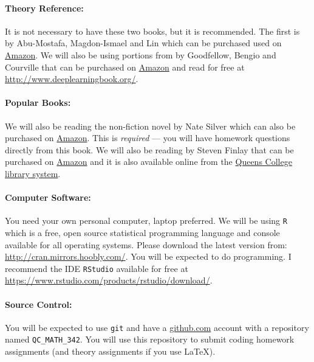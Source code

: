 \documentclass[12pt]{article}
\begin{document}
\paragraph{Theory Reference:} It is not necessary to have these two books, but it is recommended. The first is  by Abu-Mostafa, Magdon-Ismael and Lin which can be purchased used on \href{https://www.amazon.com/Learning-Data-Yaser-S-Abu-Mostafa/dp/1600490069}{Amazon}. We will also be using portions from  by Goodfellow, Bengio and Courville that can be purchased on \href{https://www.amazon.com/Deep-Learning-Adaptive-Computation-Machine/dp/0262035618}{Amazon} and read for free at \url{http://www.deeplearningbook.org/}.

\paragraph{Popular Books:} We will also be reading the non-fiction novel  by Nate Silver which can also be purchased on \href{https://www.amazon.com/Signal-Noise-Many-Predictions-Fail-but/dp/0143125087}{Amazon}. This is \textit{required} --- you will have homework questions directly from this book. We will also be reading  by Steven Finlay that can be purchased on \href{https://www.amazon.com/Predictive-Analytics-Data-Mining-Misconceptions/dp/1349478687}{Amazon} and it is also available online from the \href{https://link-springer-com.queens.ezproxy.cuny.edu/book/10.1057%2F9781137379283}{Queens College library system}. 

\paragraph{Computer Software:} You need your own personal computer, laptop preferred. We will be using \texttt{R} which is a free, open source statistical programming language and console available for all operating systems. Please download the latest version from: \url{http://cran.mirrors.hoobly.com/}. You will be expected to do programming. I recommend the IDE \texttt{RStudio} available for free at \url{https://www.rstudio.com/products/rstudio/download/}.

\paragraph{Source Control:} You will be expected to use \texttt{git} and have a \url{github.com} account with a repository named \texttt{QC\_MATH\_342}. You will use this repository to submit coding homework assignments (and theory assignments if you use \LaTeX).
\end{document}

